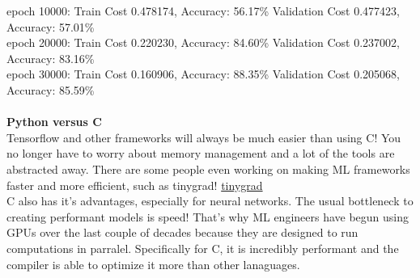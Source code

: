 \documentclass{report}
\begin{document}
epoch 10000:
Train Cost      0.478174,    Accuracy: 56.17\%
Validation Cost 0.477423,    Accuracy: 57.01\% \\

epoch 20000:
Train Cost      0.220230,    Accuracy: 84.60\%
Validation Cost 0.237002,    Accuracy: 83.16\% \\

epoch 30000:
Train Cost      0.160906,    Accuracy: 88.35\%
Validation Cost 0.205068,    Accuracy: 85.59\% \\
\\
\textbf{Python versus C} \\

Tensorflow and other frameworks will always be much easier than using C! You no longer have to worry about memory management and a lot of the tools are abstracted away. There are some people even working on making ML frameworks faster and more efficient, such as tinygrad! \href{https://github.com/tinygrad/tinygrad}{tinygrad} \\

C also has it's advantages, especially for neural networks. The usual bottleneck to creating performant models is speed! That's why ML engineers have begun using GPUs over the last couple of decades because they are designed to run computations in parralel. Specifically for C, it is incredibly performant and the compiler is able to optimize it more than other lanaguages.\\
\end{document}

